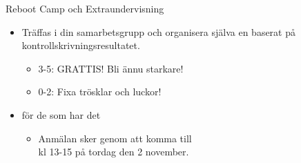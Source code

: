 
\begin{Slide}{Reboot Camp och Extraundervisning}

\begin{itemize}
  \item
  Träffas i din samarbetsgrupp och organisera själva en  baserat på kontrollskrivningsresultatet.

\begin{itemize}
  \item
  3-5: GRATTIS! Bli ännu starkare!
  \item
  0-2: Fixa trösklar och luckor!
\end{itemize}

\item {} för de som har det 
\begin{itemize}
  \item Anmälan sker genom att komma till\\ kl 13-15 på tordag den 2 november.
\end{itemize}

\end{itemize}


\vspace{0.5em}  \\\vspace{0.5em} 
\end{Slide}

